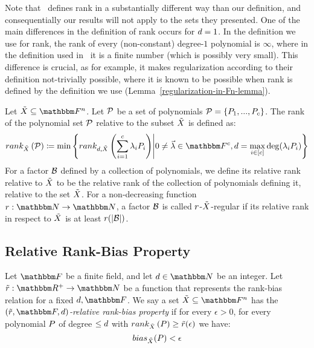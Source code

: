 \begin{note}\label{note:comparison-to-gowers-rank}
    Note that~\cite[Definition 1.3]{gowers2022equidistributionhighrankpolynomialsvariables} defines rank in a substantially different way than our definition,
    and consequentially our results will not apply to the sets they presented.
    One of the main differences in the definition of rank occurs for $d = 1$.
    In the definition we use for rank, the rank of every (non-constant) degree-$1$ polynomial is $\infty$, where in the definition used in~\cite{gowers2022equidistributionhighrankpolynomialsvariables} it is a finite number (which is possibly very small).
    This difference is crucial, as for example, it makes regularization according to their definition not-trivially possible,
    where it is known to be possible when rank is defined by the definition we use (Lemma~\ref{regularization-in-Fn-lemma}).
\end{note}
\begin{definition}
    Let $\variety \subseteq \field$.
    Let $\genpolyset$ be a set of polynomials $\genpolyset = \set{\genpoly_1,...,\genpoly_c}$.
    The rank of the polynomial set $\genpolyset$ relative to the subset ${\tilde{X}}$ is defined as:
    \[
        \relrank{\variety}{\genpolyset} \definedas \min \set{\drelrank{\degree}{\variety}{\sum_{i=1}^c{\lambda_i \genpoly_i}} \suchthat 0 \neq \vec{\lambda} \in \basefield^c, \degree = \max_{i \in \sparens{c}}{\deg(\lambda_i \genpoly_i)}}
    \]
    For a factor $\mathcal{B}$ defined by a collection of polynomials, we define its relative rank relative to ${\tilde{X}}$ to be the relative rank of the collection of polynomials defining it, relative to the set ${\tilde{X}}$.
    \newline
    For a non-decreasing function $\funcdef{\rankfunc}{\naturalnumbersset}{\naturalnumbersset}$, a factor $\mathcal{B}$ is called ${{{r}}}$-${\tilde{X}}$-regular if its relative rank in respect to ${\tilde{X}}$ is at least ${{{r}}}(\left| \mathcal{B} \right|)$.
\end{definition}

\subsection[Relative Rank-Bias Property]{Relative Rank-Bias Property}
\begin{definition}
    Let $\basefield$ be a finite field, and let $\degree \in \naturalnumbersset$ be an integer.
    Let $\funcdef{\rankbiasfunc}{\realnumbersset^{+}}{\naturalnumbersset}$ be a function that represents the rank-bias relation for a fixed $\degree, \basefield$.
    \newline
    We say a set $\variety \subseteq \field$ has the \emph{$(\rankbiasfunc, \basefield, \degree)$-relative rank-bias property} if
    for every $\epsilon > 0$,
    for every polynomial $\genpoly$ of degree $\leq d$ with $\relrank{\variety}{\genpoly} \geq \rankbiasfunc(\epsilon)$ we have:
    \[
        \relbias{\variety}{\genpoly} < \epsilon
    \]
\end{definition}

